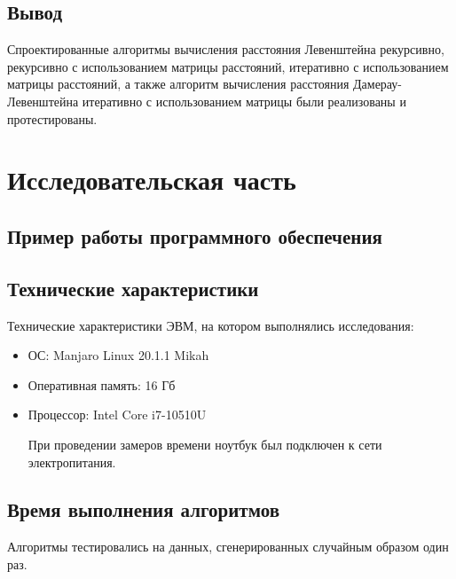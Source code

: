\documentclass[12pt]{report}
\begin{document}
\section*{Вывод}
Спроектированные алгоритмы вычисления расстояния Левенштейна рекурсивно, рекурсивно с использованием матрицы расстояний, итеративно с использованием матрицы расстояний, а также алгоритм вычисления расстояния Дамерау-Левенштейна итеративно с использованием матрицы были реализованы и протестированы.

\chapter{Исследовательская часть}

\section{Пример работы программного обеспечения}


\section{Технические характеристики}
Технические характеристики ЭВМ, на котором выполнялись исследования:
\begin{itemize}
\item ОС: Manjaro Linux 20.1.1 Mikah
\item Оперативная память: 16 Гб
\item Процессор: Intel Core i7-10510U

При проведении замеров времени ноутбук был подключен к сети электропитания.
\end{itemize}

\section{Время выполнения алгоритмов}
Алгоритмы тестировались на данных, сгенерированных случайным образом один раз.
\end{document}
